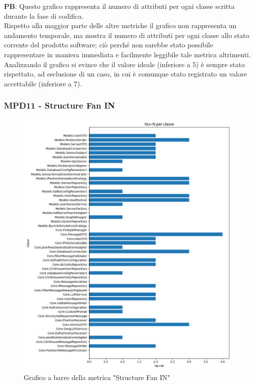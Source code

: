 \documentclass[10pt]{article}
\begin{document}
\begin{justify}
\textbf{PB}: Questo grafico rappresenta il numero di attributi per ogni classe scritta durante la fase di codifica.\\
Rispetto alla maggior parte delle altre metriche il grafico non rappresenta un andamento temporale, ma mostra il numero di attributi per ogni classe allo stato 
corrente del prodotto software; ciò perché non sarebbe stato possibile rappresentare in maniera immediata e  facilmente leggibile tale metrica altrimenti.\\
Analizzando il grafico si evince che il valore ideale (inferiore a 5) è sempre stato rispettato, ad esclusione di un caso, in cui è comunque stato registrato un valore
accettabile (inferiore a 7).\\


\subsubsection{MPD11 - Structure Fan IN}

\begin{figure}[H]
  \centering
  \includegraphics[width=0.9\linewidth]{metrics_fan_in.png}
  \caption{Grafico a barre della metrica "Structure Fan IN"}
\end{figure}


\end{justify}
\end{document}
